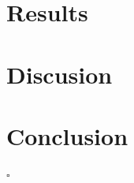 \documentclass[
    a4paper
    ,twoside
    ,notitlepage	%
  ]{article}
\begin{document}
\begin{multicols*}{2}
\section*{Results}

\section*{Discusion}

\section*{Conclusion}

\scriptsize{$\square$}\normalsize

% 
\bigskip
\begingroup
\let\clearpage\relax

\printbibliography
\endgroup
% 
\end{multicols*}
% 
\end{document}
